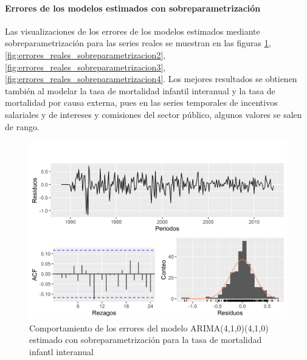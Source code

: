 \documentclass[
]{article}
\begin{document}
\paragraph{Errores de los modelos estimados con sobreparametrización}

Las visualizaciones de los errores de los modelos estimados mediante
sobreparametrización para las series reales se muestran en las figuras
\ref{fig:errores_reales_sobreparametrizacion1},
\ref{fig:errores_reales_sobreparametrizacion2},
\ref{fig:errores_reales_sobreparametrizacion3},
\ref{fig:errores_reales_sobreparametrizacion4}. Los mejores resultados
se obtienen también al modelar la tasa de mortalidad infantil interanual
y la tasa de mortalidad por causa externa, pues en las series temporales
de incentivos salariales y de intereses y comisiones del sector público,
algunos valores se salen de rango.

\begin{figure}[H]
\includegraphics[width=1\linewidth,height=1\textheight]{Tesis_files/figure-latex/errores_reales_sobreparametrizacion1-1} \caption{Comportamiento de los errores del modelo ARIMA(4,1,0)(4,1,0) estimado con sobreparametrización para la tasa de mortalidad infantl interanual}\label{fig:errores_reales_sobreparametrizacion1}
\end{figure}
\end{document}

